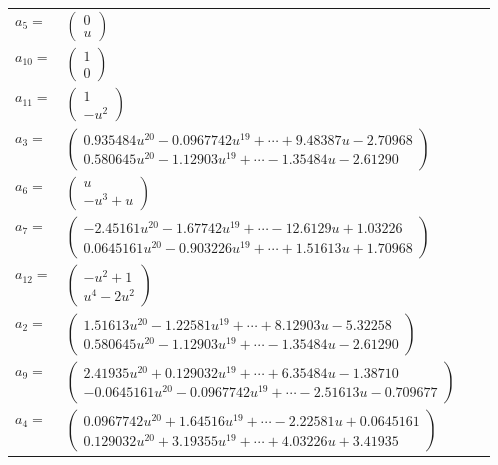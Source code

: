 \documentclass[1p]{elsarticle_modified}
\theoremstyle{definition}
\begin{document}
\begin{tabular}{m{7pt} m{180pt} m{7pt} m{180pt} }
\flushright $a_{5}=$&$\begin{pmatrix}0\\u\end{pmatrix}$ \\
\flushright $a_{10}=$&$\begin{pmatrix}1\\0\end{pmatrix}$ \\
\flushright $a_{11}=$&$\begin{pmatrix}1\\- u^2\end{pmatrix}$ \\
\flushright $a_{3}=$&$\begin{pmatrix}0.935484 u^{20}-0.0967742 u^{19}+\cdots+9.48387 u-2.70968\\0.580645 u^{20}-1.12903 u^{19}+\cdots-1.35484 u-2.61290\end{pmatrix}$ \\
\flushright $a_{6}=$&$\begin{pmatrix}u\\- u^3+u\end{pmatrix}$ \\
\flushright $a_{7}=$&$\begin{pmatrix}-2.45161 u^{20}-1.67742 u^{19}+\cdots-12.6129 u+1.03226\\0.0645161 u^{20}-0.903226 u^{19}+\cdots+1.51613 u+1.70968\end{pmatrix}$ \\
\flushright $a_{12}=$&$\begin{pmatrix}- u^2+1\\u^4-2 u^2\end{pmatrix}$ \\
\flushright $a_{2}=$&$\begin{pmatrix}1.51613 u^{20}-1.22581 u^{19}+\cdots+8.12903 u-5.32258\\0.580645 u^{20}-1.12903 u^{19}+\cdots-1.35484 u-2.61290\end{pmatrix}$ \\
\flushright $a_{9}=$&$\begin{pmatrix}2.41935 u^{20}+0.129032 u^{19}+\cdots+6.35484 u-1.38710\\-0.0645161 u^{20}-0.0967742 u^{19}+\cdots-2.51613 u-0.709677\end{pmatrix}$ \\
\flushright $a_{4}=$&$\begin{pmatrix}0.0967742 u^{20}+1.64516 u^{19}+\cdots-2.22581 u+0.0645161\\0.129032 u^{20}+3.19355 u^{19}+\cdots+4.03226 u+3.41935\end{pmatrix}$ \\

\end{tabular}
\end{document}
